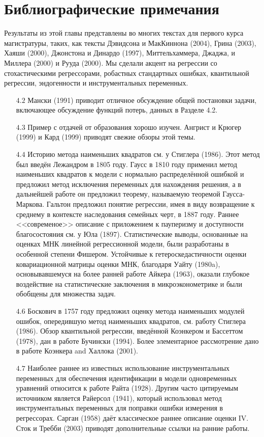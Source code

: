 \section{Библиографические примечания}

Результаты из этой главы представлены во многих текстах для первого курса магистратуры, таких, как тексты Дэвидсона и МакКиннона (2004), Грина (2003), Хаяши (2000), Джонстона и Динардо (1997), Миттельхаммера, Джаджа, и Миллера (2000) и Рууда (2000). Мы сделали акцент на регрессии со стохастическими регрессорами, робастных стандартных ошибках, квантильной регрессии, эндогенности и инструментальных переменных.

\begin{itemize}
\item [$4.2$] Мански (1991) приводит отличное обсуждение общей постановки задачи, включающее обсуждение функций потерь, данных в Разделе 4.2.
\item [$4.3$] Пример с отдачей от образования хорошо изучен. Ангрист и Крюгер (1999) и Кард
(1999) приводят свежие обзоры этой темы.
\item [$4.4$] Историю метода наименьших квадратов см. у Стиглера (1986). Этот метод был введён Лежандром в 1805 году. Гаусс в 1810 году применил метод наименьших квадратов к модели с нормально распределённой ошибкой и предложил метод исключения переменных для нахождения решения, а в дальнейшей работе он предложил теорему, называемую теоремой Гаусса-Маркова. Гальтон предложил понятие регрессии, имея в виду возвращение к среднему в контексте наследования семейных черт, в 1887 году. 
Раннее <<современое>> описание с приложением к пауперизму и доступности благосостояния см. у Юла (1897). Статистические выводы, основанные на оценках МНК линейной регрессионной модели, были разработаны в особенной степени Фишером. Устойчивые к гетероскедастичности оценки ковариационной матрицы оценки МНК, благодаря Уайту (1980a), основывавшемуся на более ранней работе Айкера (1963), оказали глубокое воздействие на статистические заключения в микроэконометрике и были обобщены для множества задач.
\item [$4.6$] Боскович в 1757 году предложил оценку метода наименьших модулей ошибок, опередившую метод наименьших квадратов, см. работу Стиглера (1986). Обзор квантильной регрессии, введённой Коэнкером и
Бассеттом (1978), дан в работе Бучински (1994). Более элементарное рассмотрение дано в работе Коэнкера and Халлока (2001).
\item [$4.7$] Наиболее раннее из известных использование инструментальных переменных для обеспечения идентификации в модели одновременных уравнений относится к работе Райта (1928). Другим часто цитируемым источником является Райерсол (1941), который использовал метод инструментальных переменных для поправки ошибки измерения в регрессорах. Сарган (1958) даёт классическое раннее описание оценки IV.  Сток и Требби (2003) приводят дополнительные ссылки на ранние работы.

\end{itemize}
